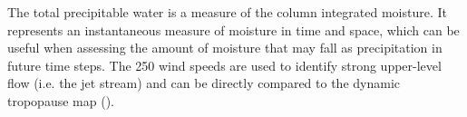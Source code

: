 The total precipitable water is a measure of the column integrated moisture. It represents an instantaneous measure of moisture in time and space, which can be useful when assessing the amount of moisture that may fall as precipitation in future time steps.
The \SI{250}{\hPa} wind speeds are used to identify strong upper-level flow (i.e. the jet stream) and can be directly compared to the dynamic tropopause map ().

% 
